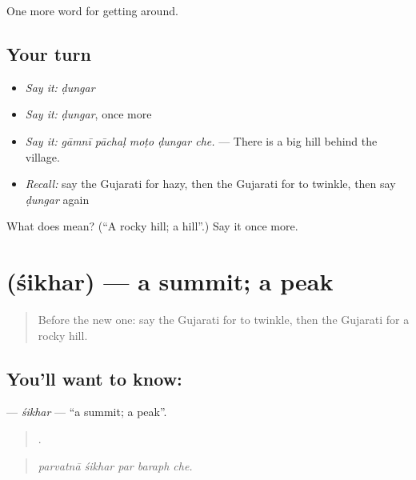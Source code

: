 \begin{grammarlens}[title={What you've built}]
One more word for getting around.
\end{grammarlens}

\subsection*{Your turn}
\begin{itemize}
\raggedright
  \item \emph{Say it:} \emph{ḍungar}
  \item \emph{Say it:} \emph{ḍungar}, once more
  \item \emph{Say it:} \emph{gāmnī pāchaḷ moṭo ḍungar che.} — There is a big hill behind the village.
  \item \emph{Recall:} say the Gujarati for hazy, then the Gujarati for to twinkle, then say \emph{ḍungar} again
\end{itemize}

\begin{tcolorbox}[breakable,colback=teal!4,colframe=teal!35!black,title={Before you move on}]
What does  mean? (\textquotedblleft{}A rocky hill; a hill\textquotedblright{}.) Say it once more.
\end{tcolorbox}
\section[\texorpdfstring{\gu{શિખર} (śikhar)}{શિખર (śikhar)}]{ (śikhar) — a summit; a peak}

\label{lesson:GU-C439-sikhar}



\begin{quote}
Before the new one: say the Gujarati for to twinkle, then the Gujarati for a rocky hill.
\end{quote}

\subsection*{You'll want to know: }
\textbf{} — \emph{śikhar} — \textquotedblleft{}a summit; a peak\textquotedblright{}.

\begin{quote}
    .
\end{quote}

\begin{quote}
\emph{parvatnā śikhar par baraph che.}
\end{quote}


